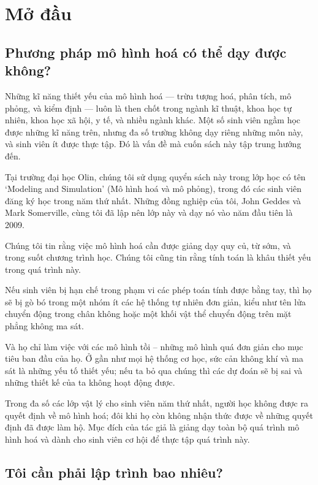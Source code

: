 \documentclass[12pt]{book}
\theoremstyle{exercise}
\begin{document}
\fi

\chapter{Mở đầu}
\label{preface}


\section{Phương pháp mô hình hoá có thể dạy được không?}

Những kĩ năng thiết yếu của mô hình hoá --- trừu tượng hoá, phân tích, mô phỏng, và kiểm định --- luôn là then chốt trong ngành kĩ thuật, khoa học tự nhiên, khoa học xã hội, y tế, và nhiều ngành khác. Một số sinh viên ngầm học được những kĩ năng trên, nhưng đa số trường không dạy riêng những môn này, và sinh viên ít được thực tập. Đó là vấn đề mà cuốn sách này tập trung hướng đến.

Tại trường đại học Olin, chúng tôi sử dụng quyển sách này trong lớp học có tên `Modeling and Simulation' (Mô hình hoá và mô phỏng), trong đó các sinh viên đăng ký học trong năm thứ nhất. Những đồng nghiệp của tôi, John Geddes và Mark Somerville, cùng tôi đã lập nên lớp này và dạy nó vào năm đầu tiên là 2009.

Chúng tôi tin rằng việc mô hình hoá cần được giảng dạy quy củ, từ sớm, và trong suốt chương trình học. Chúng tôi cũng tin rằng tính toán là khâu thiết yếu trong quá trình này. 

Nếu sinh viên bị hạn chế trong phạm vi các phép toán tính được bằng tay, thì họ sẽ bị gò bó trong một nhóm ít các hệ thống tự nhiên đơn giản, kiểu như tên lửa chuyển động trong chân không hoặc một khối vật thể chuyển động trên mặt phẳng không ma sát.

Và họ chỉ làm việc với các mô hình tồi -- những mô hình quá đơn giản cho mục tiêu ban đầu của họ. Ở gần như mọi hệ thống cơ học, sức cản không khí và ma sát là những yếu tố thiết yếu; nếu ta bỏ qua chúng thì các dự đoán sẽ bị sai và những thiết kế của ta không hoạt động được.

Trong đa số các lớp vật lý cho sinh viên năm thứ nhất, người học không được ra quyết định về mô hình hoá; đôi khi họ còn không nhận thức được về những quyết định đã được làm hộ. Mục đích của tác giả là giảng dạy toàn bộ quá trình mô hình hoá và dành cho sinh viên cơ hội để thực tập quá trình này.


\section{Tôi cần phải lập trình bao nhiêu?}
\end{document}
